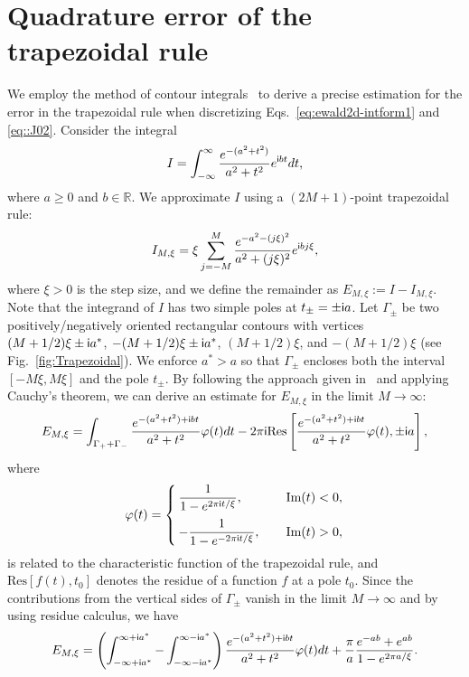 \section{Quadrature error of the trapezoidal rule}\label{app::trapezoidal}
We employ the method of contour integrals~\cite{Donaldson1972SINUA,trefethen2014Rev} to derive a precise estimation for the error in  {the} trapezoidal rule when discretizing Eqs.~\eqref{eq:ewald2d-intform1} and \eqref{eq::J02}. Consider the integral
\begin{equation}\label{eq::A.1}
I=\int_{-\infty}^{\infty }\frac{e^{-(a^2+t^2)}}{a^2+t^2}e^{\mathsf i b t}dt,
\end{equation}
where $a\geq 0$ and $b\in\mathbb{R}$. We approximate $I$ using a $(2M+1)$-point trapezoidal rule:
\begin{equation}
I_{M,\xi}=\xi\sum_{j=-M}^{M}\frac{e^{-a^2-(j\xi)^2}}{a^2+(j\xi)^2}e^{\mathsf i b j\xi},
\end{equation}
where $\xi>0$ is the step size, and we define the remainder as $E_{M,\xi}:=I-I_{M,\xi}$. Note that the integrand of $I$ has two simple poles at $t_{\pm}=\pm \mathsf i a$. Let $\Gamma_{\pm}$ be two positively/negatively oriented rectangular contours with vertices $(M+1/2)\xi\pm\mathsf i a^*$, $-(M+1/2)\xi\pm\mathsf i a^*$, $(M+1/2)\xi$, and $-(M+1/2)\xi$ (see Fig.~\ref{fig:Trapezoidal}). We enforce $a^*>a$ so that $\Gamma_{\pm}$ encloses both the interval $[-M \xi,M \xi]$ and the pole $t_{\pm}$. By following the approach given in~\cite{Donaldson1972SINUA} and applying Cauchy's theorem, we can derive an estimate for $E_{M,\xi}$ in the limit $M\rightarrow \infty$:
\begin{equation}
E_{M,\xi}=\int_{\Gamma_++\Gamma_-}\frac{e^{-(a^2+t^2)+\mathsf i b t}}{a^2+t^2}\varphi(t)dt-2\pi\mathsf i \text{Res}\left[\frac{e^{-(a^2+t^2)+\mathsf i b t}}{a^2+t^2}\varphi(t),\pm \mathsf i a\right],
\end{equation}
where
\begin{align}
\varphi(t)=\begin{cases}
\dfrac{1}{1-e^{2\pi\mathsf i t/\xi}},\,\quad &\text{Im}(t)<0,\\[1em]
-\dfrac{1}{1-e^{-2\pi\mathsf i t/\xi}},\,\quad&\text{Im}(t)>0,
\end{cases}
\end{align}
is related to the characteristic function of the trapezoidal rule, and $\text{Res}[f(t),t_0]$ denotes the residue of a function $f$ at a pole $t_0$. Since the contributions from the vertical sides of $\Gamma_{\pm}$ vanish in the limit $M\rightarrow \infty$ and by using residue calculus, we have
\begin{equation}\label{eq::A.5}
E_{M,\xi}=\left(\int_{-\infty+\mathsf i a^*}^{\infty+\mathsf i a^*}-\int_{-\infty-\mathsf i a^*}^{\infty-\mathsf i a^*}\right)\frac{e^{-(a^2+t^2)+\mathsf i b t}}{a^2+t^2}\varphi(t)dt+\frac{\pi}{a}\frac{e^{-ab}+e^{ab}}{1-e^{2\pi a/\xi}}.
\end{equation}
